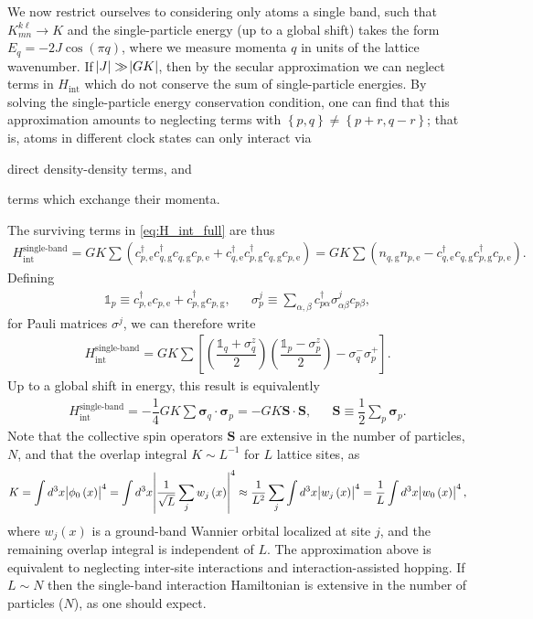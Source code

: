 \documentclass[aps,notitlepage,nofootinbib,11pt]{revtex4-1}
\renewcommand{\t}{\text} %
\newcommand{\f}[2]{\dfrac{#1}{#2}} %
\newcommand{\p}[1]{\left(#1\right)} %
\renewcommand{\sp}[1]{\left[#1\right]} %
\renewcommand{\set}[1]{\left\{#1\right\}} %
\renewcommand{\v}{\bm} %
\renewcommand{\c}{\cdot} %
\newcommand{\1}{\mathds{1}}
\newcommand{\g}{\text{g}}
\newcommand{\e}{\text{e}}
\begin{document}
We now restrict ourselves to considering only atoms a single band,
such that $K^{k\ell}_{mn}\to K$ and the single-particle energy (up to
a global shift) takes the form $E_q=-2J\cos\p{\pi q}$, where we measure
momenta $q$ in units of the lattice wavenumber.  If
$\abs{J}\gg\abs{GK}$, then by the secular approximation we can neglect
terms in $H_{\t{int}}$ which do not conserve the sum of
single-particle energies.  By solving the single-particle energy
conservation condition, one can find that this approximation amounts
to neglecting terms with $\set{p,q}\ne\set{p+r,q-r}$; that is, atoms
in different clock states can only interact via
\begin{enumerate*}[label=(\roman*)]
\item direct density-density terms, and
\item terms which exchange their momenta.
\end{enumerate*}
The surviving terms in \eqref{eq:H_int_full} are thus
\begin{align}
  H_{\t{int}}^{\t{single-band}}
  = G K \sum \p{c_{p,\e}^\dag c_{q,\g}^\dag c_{q,\g} c_{p,\e}
    + c_{q,\e}^\dag c_{p,\g}^\dag c_{q,\g} c_{p,\e}}
  = G K \sum \p{n_{q,\g} n_{p,\e}
    - c_{q,\e}^\dag c_{q,\g} c_{p,\g}^\dag c_{p,\e}}.
\end{align}
Defining
\begin{align}
  \1_p \equiv c_{p,\e}^\dag c_{p,\e} + c_{p,\g}^\dag c_{p,\g},
  &&
  \sigma_p^j \equiv \sum_{\alpha,\beta}
  c_{p\alpha}^\dag \sigma^j_{\alpha\beta} c_{p\beta},
\end{align}
for Pauli matrices $\sigma^j$, we can therefore write
\begin{align}
  H_{\t{int}}^{\t{single-band}} = G K \sum
  \sp{\p{\f{\1_q+\sigma_q^z}{2}} \p{\f{\1_p-\sigma_p^z}{2}}
    - \sigma_q^- \sigma_p^+}.
\end{align}
Up to a global shift in energy, this result is equivalently
\begin{align}
  H_{\t{int}}^{\t{single-band}}
  = - \f14 G K \sum \v\sigma_q\c\v\sigma_p
  = - G K \v S \c \v S,
  &&
  \v S \equiv \f12 \sum_p \v\sigma_p.
\end{align}
Note that the collective spin operators $\v S$ are extensive in the
number of particles, $N$, and that the overlap integral $K\sim L^{-1}$
for $L$ lattice sites, as
\begin{align}
  K = \int d^3x \abs{\phi_0\p{x}}^4
  = \int d^3x \abs{\f1{\sqrt{L}}\sum_j w_j\p{x}}^4
  \approx \f1{L^2} \sum_j \int d^3x \abs{w_j\p{x}}^4
  = \f1L \int d^3x \abs{w_0\p{x}}^4,
\end{align}
where $w_j\p{x}$ is a ground-band Wannier orbital localized at site
$j$, and the remaining overlap integral is independent of $L$.  The
approximation above is equivalent to neglecting inter-site
interactions and interaction-assisted hopping.  If $L\sim N$ then the
single-band interaction Hamiltonian is extensive in the number of
particles ($N$), as one should expect.
\end{document}

